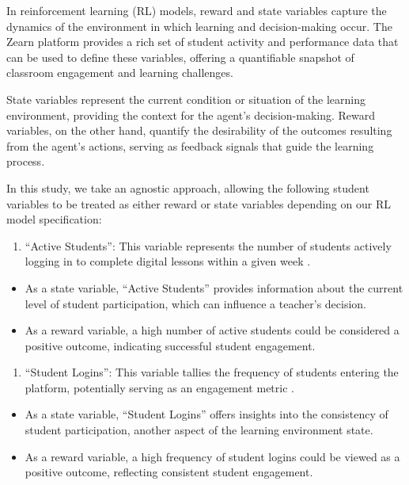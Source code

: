 \documentclass[
  number,
  preprint,
  3p,
  onecolumn]{elsarticle}
\providecommand{\tightlist}{%
  \setlength{\itemsep}{0pt}\setlength{\parskip}{0pt}}\usepackage{longtable,booktabs,array}
\begin{document}
In reinforcement learning (RL) models, reward and state variables
capture the dynamics of the environment in which learning and
decision-making occur. The Zearn platform provides a rich set of student
activity and performance data that can be used to define these
variables, offering a quantifiable snapshot of classroom engagement and
learning challenges.

State variables represent the current condition or situation of the
learning environment, providing the context for the agent's
decision-making. Reward variables, on the other hand, quantify the
desirability of the outcomes resulting from the agent's actions, serving
as feedback signals that guide the learning process.

In this study, we take an agnostic approach, allowing the following
student variables to be treated as either reward or state variables
depending on our RL model specification:

\begin{enumerate}
\def\labelenumi{\arabic{enumi}.}
\tightlist
\item
  ``Active Students'': This variable represents the number of students
  actively logging in to complete digital lessons within a given week
  \citep{zearn2022}.
\end{enumerate}

\begin{itemize}
\tightlist
\item
  As a state variable, ``Active Students'' provides information about
  the current level of student participation, which can influence a
  teacher's decision.
\item
  As a reward variable, a high number of active students could be
  considered a positive outcome, indicating successful student
  engagement.
\end{itemize}

\begin{enumerate}
\def\labelenumi{\arabic{enumi}.}
\setcounter{enumi}{1}
\tightlist
\item
  ``Student Logins'': This variable tallies the frequency of students
  entering the platform, potentially serving as an engagement metric
  \citep{zearn2024}.
\end{enumerate}

\begin{itemize}
\tightlist
\item
  As a state variable, ``Student Logins'' offers insights into the
  consistency of student participation, another aspect of the learning
  environment state.
\item
  As a reward variable, a high frequency of student logins could be
  viewed as a positive outcome, reflecting consistent student
  engagement.
\end{itemize}
\end{document}
